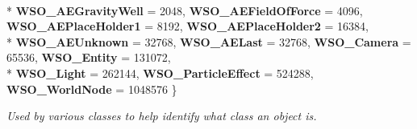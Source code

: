 \begin{DoxyCompactItemize}
\\*
{\bfseries W\-S\-O\-\_\-\-A\-E\-Gravity\-Well} =  2048, 
{\bfseries W\-S\-O\-\_\-\-A\-E\-Field\-Of\-Force} =  4096, 
{\bfseries W\-S\-O\-\_\-\-A\-E\-Place\-Holder1} =  8192, 
{\bfseries W\-S\-O\-\_\-\-A\-E\-Place\-Holder2} =  16384, 
\\*
{\bfseries W\-S\-O\-\_\-\-A\-E\-Unknown} =  32768, 
{\bfseries W\-S\-O\-\_\-\-A\-E\-Last} =  32768, 
{\bfseries W\-S\-O\-\_\-\-Camera} =  65536, 
{\bfseries W\-S\-O\-\_\-\-Entity} =  131072, 
\\*
{\bfseries W\-S\-O\-\_\-\-Light} =  262144, 
{\bfseries W\-S\-O\-\_\-\-Particle\-Effect} =  524288, 
{\bfseries W\-S\-O\-\_\-\-World\-Node} =  1048576
 \}
\begin{DoxyCompactList}\small\item\em Used by various classes to help identify what class an object is. \end{DoxyCompactList}\end{DoxyCompactItemize}
